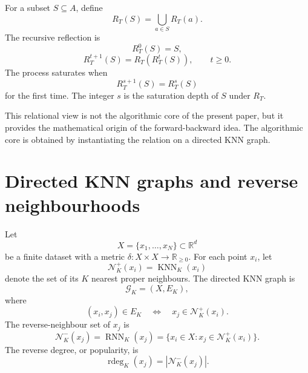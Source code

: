 \documentclass[pdflatex,sn-mathphys-num]{sn-jnl}
\newcommand{\R}{\mathbb{R}}
\newcommand{\calG}{\mathcal{G}}
\newcommand{\calN}{\mathcal{N}}
\newcommand{\KNN}{\operatorname{KNN}}
\newcommand{\RNN}{\operatorname{RNN}}
\newcommand{\rdeg}{\operatorname{rdeg}}
\begin{document}
For a subset $S\subseteq A$, define
\begin{equation}
R_T(S)=\bigcup_{a\in S}R_T(a).
\end{equation}
The recursive reflection is
\begin{equation}
R_T^0(S)=S,
\end{equation}
\begin{equation}
R_T^{t+1}(S)=R_T(R_T^t(S)),\qquad t\geq 0.
\label{eq:relational_iteration}
\end{equation}
The process saturates when
\begin{equation}
R_T^{s+1}(S)=R_T^s(S)
\end{equation}
for the first time. The integer $s$ is the saturation depth of $S$ under $R_T$.

This relational view is not the algorithmic core of the present paper, but it provides the mathematical origin of the forward-backward idea. The algorithmic core is obtained by instantiating the relation on a directed KNN graph.

\section{Directed KNN graphs and reverse neighbourhoods}\label{sec:KNN_graph}

Let
\begin{equation}
X=\{x_1,\ldots,x_N\}\subset\R^d
\end{equation}
be a finite dataset with a metric $\delta:X\times X\to\R_{\geq 0}$. For each point $x_i$, let
\begin{equation}
\calN_K^+(x_i)=\KNN_K(x_i)
\end{equation}
denote the set of its $K$ nearest proper neighbours. The directed KNN graph is
\begin{equation}
\calG_K=(X,E_K),
\end{equation}
where
\begin{equation}
(x_i,x_j)\in E_K \quad\Longleftrightarrow\quad x_j\in\calN_K^+(x_i).
\end{equation}
The reverse-neighbour set of $x_j$ is
\begin{equation}
\calN_K^-(x_j)=\RNN_K(x_j)=\{x_i\in X:x_j\in\calN_K^+(x_i)\}.
\label{eq:rnn}
\end{equation}
The reverse degree, or popularity, is
\begin{equation}
\rdeg_K(x_j)=|\calN_K^-(x_j)|.
\label{eq:reverse_degree}
\end{equation}
\end{document}
